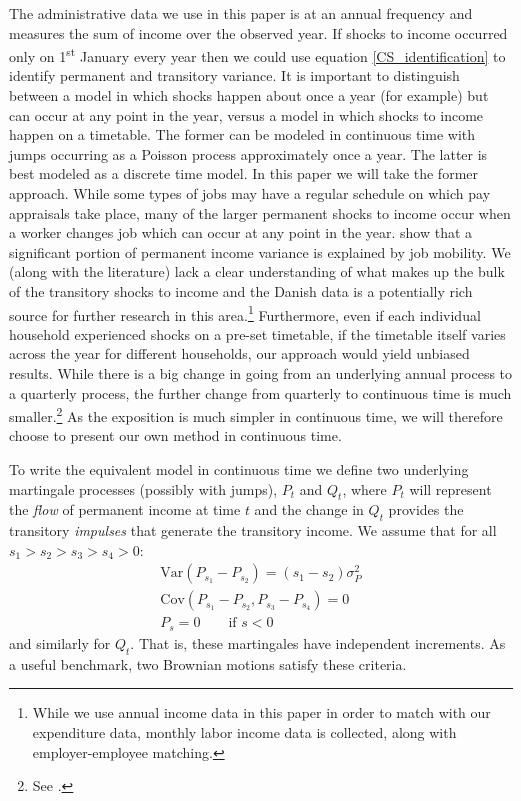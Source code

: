 \documentclass[titlepage]{\econtex}\newcommand{\texname}{ConsumptionHeterogeneity}
\begin{document}
The administrative data we use in this paper is at an annual frequency and measures the sum of income over the observed year. If shocks to income occurred only on 1\textsuperscript{st} January every year then we could use equation \ref{CS_identification} to identify permanent and transitory variance. It is important to distinguish between a model in which shocks happen about once a year (for example) but can occur at any point in the year, versus a model in which shocks to income happen on a timetable. The former can be modeled in continuous time with jumps occurring as a Poisson process approximately once a year. The latter is best modeled as a discrete time model. In this paper we will take the former approach. While some types of jobs may have a regular schedule on which pay appraisals take place, many of the larger permanent shocks to income occur when a worker changes job which can occur at any point in the year. {\cite{low_wage_2010} show that a significant portion of permanent income variance is explained by job mobility.} We (along with the literature) lack a clear understanding of what makes up the bulk of the transitory shocks to income and the Danish data is a potentially rich source for further research in this area.\footnote{While we use annual income data in this paper in order to match with our expenditure data, monthly labor income data is collected, along with employer-employee matching.} Furthermore, even if each individual household experienced shocks on a pre-set timetable, if the timetable itself varies across the year for different households, our approach would yield unbiased results. While there is a big change in going from an underlying annual process to a quarterly process, the further change from quarterly to continuous time is much smaller.\footnote{See \cite{crawley_time_2018}.} As the exposition is much simpler in continuous time, we will therefore choose to present our own method in continuous time.

To write the equivalent model in continuous time we define two underlying martingale processes (possibly with jumps), $P_t$ and $Q_t$, where $P_t$ will represent the \textit{flow} of permanent income at time $t$ and the change in $Q_t$ provides the transitory \textit{impulses} that generate the transitory income. We assume that for all  $s_1>s_2>s_3>s_4>0$:
\begin{align*}
\mathrm{Var}(P_{s_1}-P_{s_2})=(s_1-s_2)\sigma_P^2 \\
\mathrm{Cov}(P_{s_1}-P_{s_2},P_{s_3}-P_{s_4}) = 0 \\
P_s = 0 \qquad \text{if } s<0
\end{align*}
and similarly for $Q_t$. That is, these martingales have independent increments. As a useful benchmark, two Brownian motions satisfy these criteria.
\end{document}

